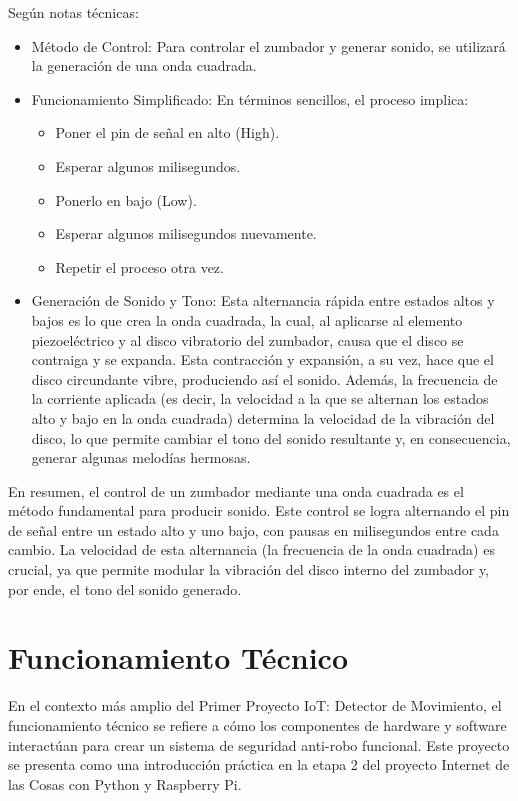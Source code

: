 \documentclass{report}
\begin{document}
Según notas técnicas:
\begin{itemize}
    \item Método de Control: Para controlar el zumbador y generar sonido, se utilizará la generación de una onda cuadrada.
    \item Funcionamiento Simplificado: En términos sencillos, el proceso implica:
    \begin{itemize}
        \item Poner el pin de señal en alto (High).
        \item Esperar algunos milisegundos.
        \item Ponerlo en bajo (Low).
        \item Esperar algunos milisegundos nuevamente.
        \item Repetir el proceso otra vez.
    \end{itemize}
    \item Generación de Sonido y Tono: Esta alternancia rápida entre estados altos y bajos es lo que crea la onda cuadrada, la cual, al aplicarse 
    al elemento piezoeléctrico y al disco vibratorio del zumbador, causa que el disco se contraiga y se expanda. Esta contracción y expansión, a su 
    vez, hace que el disco circundante vibre, produciendo así el sonido. Además, la frecuencia de la corriente aplicada (es decir, la velocidad a 
    la que se alternan los estados alto y bajo en la onda cuadrada) determina la velocidad de la vibración del disco, lo que permite cambiar el 
    tono del sonido resultante y, en consecuencia, generar algunas melodías hermosas.
\end{itemize}
En resumen, el control de un zumbador mediante una onda cuadrada es el método fundamental para producir sonido. Este control se logra alternando 
el pin de señal entre un estado alto y uno bajo, con pausas en milisegundos entre cada cambio. La velocidad de esta alternancia (la frecuencia de 
la onda cuadrada) es crucial, ya que permite modular la vibración del disco interno del zumbador y, por ende, el tono del sonido generado.

\section{Funcionamiento Técnico}
En el contexto más amplio del Primer Proyecto IoT: Detector de Movimiento, el funcionamiento técnico se refiere a cómo los componentes de hardware y 
software interactúan para crear un sistema de seguridad anti-robo funcional. Este proyecto se presenta como una introducción práctica en la etapa 2 
del proyecto Internet de las Cosas con Python y Raspberry Pi.
\end{document}
